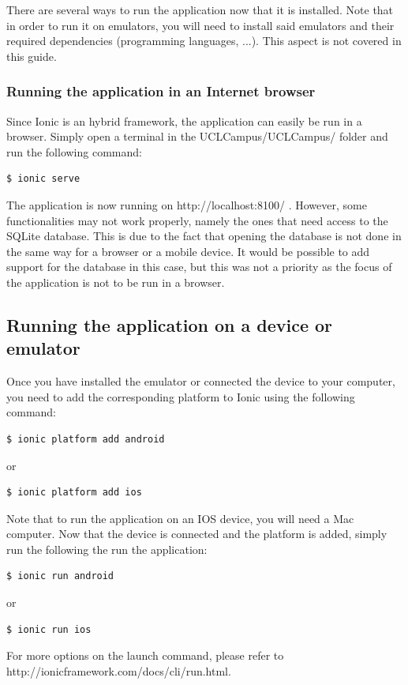 \documentclass{eplmastersthesis}
\begin{document}
There are several ways to run the application now that it is installed. Note that in order to run it on emulators, you will need to install said emulators and their required dependencies (programming languages, ...). This aspect is not covered in this guide.

\subsubsection{Running the application in an Internet browser}

Since Ionic is an hybrid framework, the application can easily be run in a browser. Simply open a terminal in the UCLCampus/UCLCampus/ folder and run the following command:

\begin{lstlisting}[language=bash]
   $ ionic serve
\end{lstlisting} 
The application is now running on http://localhost:8100/ . However, some functionalities may not work properly, namely the ones that need access to the SQLite database. This is due to the fact that opening the database is not done in the same way for a browser or a mobile device. It would be possible to add support for the database in this case, but this was not a priority as the focus of the application is not to be run in a browser.
\subsection{Running the application on a device or emulator}
Once you have installed the emulator or connected the device to your computer, you need to add the corresponding platform to Ionic using the following command:
\begin{lstlisting}[language=bash]
   $ ionic platform add android
\end{lstlisting} 

or

\begin{lstlisting}[language=bash]
   $ ionic platform add ios
\end{lstlisting} 
Note that to run the application on an IOS device, you will need a Mac computer. Now that the device is connected and the platform is added, simply run the following the run the application:
\begin{lstlisting}[language=bash]
   $ ionic run android
\end{lstlisting} 

or 

\begin{lstlisting}[language=bash]
   $ ionic run ios
\end{lstlisting} 
For more options on the launch command, please refer to http://ionicframework.com/docs/cli/run.html.
\end{document}
